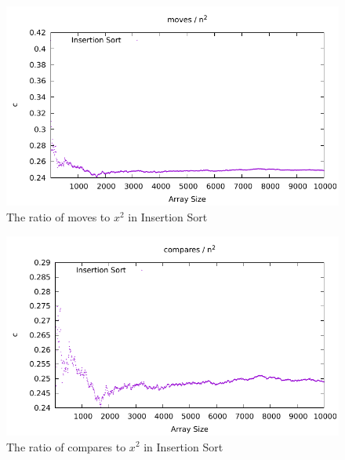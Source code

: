 \documentclass[12pt]{article}
\begin{document}
\begin{figure}[H]\begin{centering}
\includegraphics{plots/nn-moves-insertion.pdf}\caption{The ratio of moves to $x^2$ in Insertion Sort}
\end{centering}\end{figure}
\begin{figure}[H]\begin{centering}
\includegraphics{plots/nn-compares-insertion.pdf}\caption{The ratio of compares to $x^2$ in Insertion Sort}
\end{centering}\end{figure}
\end{document}
